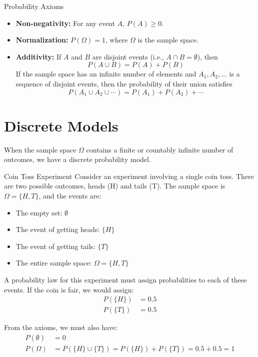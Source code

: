 \begin{itemize}
\begin{definitionboxbreak}{Probability Axioms}
    \begin{itemize}
        \item \textbf{Non-negativity:} For any event \(A\), \(P(A) \geq 0\).
        \item \textbf{Normalization:} \(P(\Omega) = 1\), where \(\Omega\) is the sample space.
        \item \textbf{Additivity:} If \(A\) and \(B\) are disjoint events (i.e., \(A \cap B = \emptyset\)), then 
        \[ P(A \cup B) = P(A) + P(B)\]
        If the sample space has an infinite number of elements
and \(A_1, A_2, \ldots\) is a sequence of disjoint events, then the probability of
their union satisfies
\[ P(A_1 \cup A_2 \cup \cdots) = P(A_1) + P(A_2) + \cdots \]
    \end{itemize}
\end{definitionboxbreak}



\section{Discrete Models}

When the sample space \(\Omega\) contains a finite or countably infinite number of outcomes, we have a discrete probability model.

\begin{exampleboxbreak}{Coin Toss Experiment}
Consider an experiment involving a single coin toss. There are two possible outcomes, heads (H) and tails (T). The sample space is $\Omega = \{H, T\}$, and the events are:
\begin{itemize}
    \item The empty set: $\emptyset$
    \item The event of getting heads: $\{H\}$
    \item The event of getting tails: $\{T\}$
    \item The entire sample space: $\Omega = \{H, T\}$
\end{itemize}

A probability law for this experiment must assign probabilities to each of these events. If the coin is fair, we would assign:
\begin{align}
P(\{H\}) &= 0.5\\
P(\{T\}) &= 0.5
\end{align}

From the axioms, we must also have:
\begin{align}
P(\emptyset) &= 0\\
P(\Omega) &= P(\{H\} \cup \{T\}) = P(\{H\}) + P(\{T\}) = 0.5 + 0.5 = 1
\end{align}


\end{exampleboxbreak}
\end{itemize}
